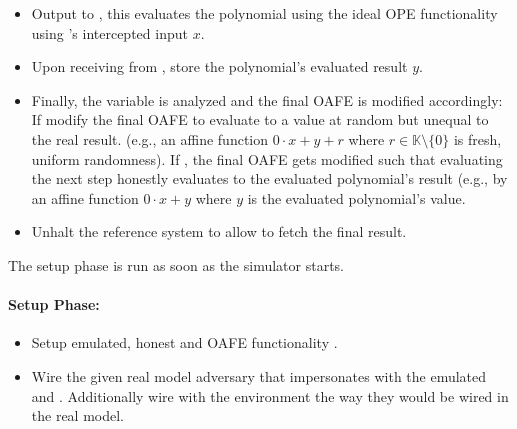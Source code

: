 \begin{itemize}

  \item Output  to \JWfuncSymOPEnp{}, this evaluates the
    polynomial using the ideal OPE functionality using \JWpTwo{}'s intercepted
    input $x$.

  \item Upon receiving  from \JWfuncSymOPEnp{}, store
    the polynomial's evaluated result $y$.

  \item Finally, the variable  is analyzed and the final OAFE is
    modified accordingly: If  modify the final OAFE to
    evaluate to a value at random but unequal to the real result. (e.g., an
    affine function $0 \cdot x + y + r$ where $r \in \mathbb{K} \setminus \{0\}$
    is fresh, uniform randomness). If , the final OAFE
    gets modified such that evaluating the next step honestly evaluates to the
    evaluated polynomial's result (e.g., by an affine function $0 \cdot x + y$
    where $y$ is the evaluated polynomial's value.

  \item Unhalt the reference system to allow \JWadv{} to fetch the final
    result.

\end{itemize}


\label{sec:simulator-goliath}

The setup phase is run as soon as the simulator starts.

\paragraph{Setup Phase:}

\begin{itemize}

  \item Setup emulated, honest \JWpTwo{} and OAFE functionality
    \JWfuncSymOAFE{}.

  \item Wire the given real model adversary \JWadv{} that impersonates \JWpOne{}
    with the emulated \JWpTwo{} and \JWfuncSymOAFE{}. Additionally wire \JWadv{}
    with the environment the way they would be wired in the real model.

\end{itemize}

